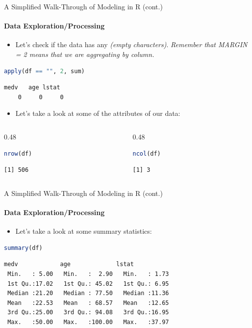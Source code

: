 \begin{frame}[fragile]{A Simplified Walk-Through of Modeling in R (cont.)}
\framesubtitle{Data Exploration/Processing}
\begin{itemize}
  \item Let’s check if the data has any  \textit{(empty characters)}. \textit{Remember that MARGIN = 2 means that we are aggregating by column.}
\end{itemize}
\begin{lstlisting}[language=R]
apply(df == "", 2, sum)
\end{lstlisting}
\begin{lstlisting}[style=output]
 medv   age lstat 
    0     0     0
\end{lstlisting}
\begin{itemize}
  \item Let’s take a look at some of the attributes of our data:
\end{itemize}
\begin{columns}[T]
\begin{column}{0.48\textwidth}
\begin{lstlisting}[language=R]
nrow(df)
\end{lstlisting}
\begin{lstlisting}[style=output]
[1] 506
\end{lstlisting}
\end{column}
\begin{column}{0.48\textwidth}
\begin{lstlisting}[language=R]
ncol(df)
\end{lstlisting}
\begin{lstlisting}[style=output]
[1] 3
\end{lstlisting}
\end{column}
\end{columns}
\end{frame}

\begin{frame}[fragile]{A Simplified Walk-Through of Modeling in R (cont.)}
\framesubtitle{Data Exploration/Processing}
\begin{itemize}
  \item Let’s take a look at some summary statistics:
\end{itemize}
\begin{lstlisting}[language=R]
summary(df)
\end{lstlisting}
\begin{lstlisting}[style=output]
      medv            age             lstat      
 Min.   : 5.00   Min.   :  2.90   Min.   : 1.73  
 1st Qu.:17.02   1st Qu.: 45.02   1st Qu.: 6.95  
 Median :21.20   Median : 77.50   Median :11.36  
 Mean   :22.53   Mean   : 68.57   Mean   :12.65  
 3rd Qu.:25.00   3rd Qu.: 94.08   3rd Qu.:16.95  
 Max.   :50.00   Max.   :100.00   Max.   :37.97
\end{lstlisting}
\end{frame}

